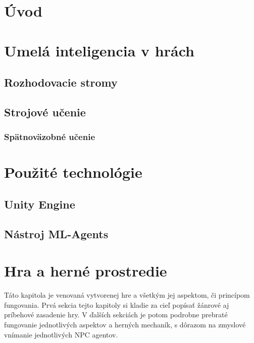\documentclass[slovak, master]{diploma}
\begin{document}
\MakeTitlePages

\listoffigures
\clearpage

\listoftables
\clearpage

\lstlistoflistings
\clearpage

\chapter{Úvod}
\label{sec:Introduction}


\chapter{Umelá inteligencia v hrách}
\label{sec:AI in games}

\section{Rozhodovacie stromy}
\label{sec:DecisionTreesOverview}

\section{Strojové učenie}
\label{sec:MachineLearningOverview}
\subsection{Spätnoväzobné učenie}
\label{sec:ReinforcemenLearningOverview}


\chapter{Použité technológie}
\label{sec:Tech}
\section{Unity Engine}
\label{sec:Unity}
\section{Nástroj ML-Agents}
\label{sec:ML-Agents}

\chapter{Hra a herné prostredie}
\label{sec:GameOverview}
Táto kapitola je venovaná vytvorenej hre a všetkým jej aspektom, či princípom fungovania. Prvá sekcia tejto kapitoly si kladie za cieľ popísať žánrové aj príbehové zasadenie hry. V ďalších sekciách je potom podrobne prebraté fungovanie jednotlivých aspektov a herných mechaník, s dôrazom na zmyslové vnímanie jednotlivých NPC agentov.
\end{document}
